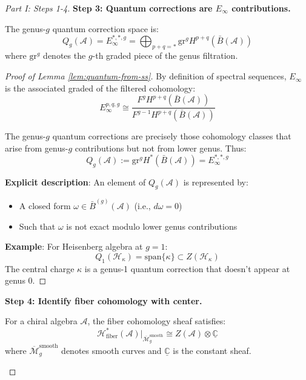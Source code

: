 \begin{proof}[Part I: Steps 1-4]
\textbf{Step 3: Quantum corrections are $E_\infty$ contributions.}

\begin{lemma}
\label{lem:quantum-from-ss}
The genus-$g$ quantum correction space is:
\begin{equation}
Q_g(\mathcal{A}) = E_\infty^{*,*,g} = \bigoplus_{p+q=*} \text{gr}^g H^{p+q}(
\bar{B}(\mathcal{A}))
\end{equation}
where $\text{gr}^g$ denotes the $g$-th graded piece of the genus filtration.
\end{lemma}

\begin{proof}[Proof of Lemma \ref{lem:quantum-from-ss}]
By definition of spectral sequences, $E_\infty$ is the associated graded of the 
filtered cohomology:
\begin{equation}
E_\infty^{p,q,g} \cong \frac{F^g H^{p+q}(\bar{B}(\mathcal{A}))}{F^{g-1} H^{p+q}(
\bar{B}(\mathcal{A}))}
\end{equation}

The genus-$g$ quantum corrections are precisely those cohomology classes that arise 
from genus-$g$ contributions but not from lower genus. Thus:
\begin{equation}
Q_g(\mathcal{A}) := \text{gr}^g H^*(\bar{B}(\mathcal{A})) = E_\infty^{*,*,g}
\end{equation}

\textbf{Explicit description}: An element of $Q_g(\mathcal{A})$ is represented by:
\begin{itemize}
\item A closed form $\omega \in \bar{B}^{(g)}(\mathcal{A})$ (i.e., $d\omega = 0$)
\item Such that $\omega$ is not exact modulo lower genus contributions
\end{itemize}

\textbf{Example}: For Heisenberg algebra at $g=1$:
\begin{equation}
Q_1(\mathcal{H}_\kappa) = \text{span}\{\kappa\} \subset Z(\mathcal{H}_\kappa)
\end{equation}
The central charge $\kappa$ is a genus-1 quantum correction that doesn't appear at 
genus 0.
\end{proof}

\textbf{Step 4: Identify fiber cohomology with center.}

\begin{lemma}
\label{lem:fiber-cohomology-center}
For a chiral algebra $\mathcal{A}$, the fiber cohomology sheaf satisfies:
\begin{equation}
\mathcal{H}^*_{\text{fiber}}(\mathcal{A})|_{\overline{\mathcal{M}}_g^{\text{smooth}}} 
\cong Z(\mathcal{A}) \otimes \underline{\mathbb{C}}
\end{equation}
where $\overline{\mathcal{M}}_g^{\text{smooth}}$ denotes smooth curves and 
$\underline{\mathbb{C}}$ is the constant sheaf.
\end{lemma}


\end{proof}
